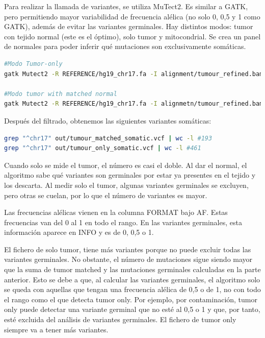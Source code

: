 Para realizar la llamada de variantes, se utiliza MuTect2. Es similar a GATK, pero permitiendo mayor variabilidad de frecuencia alélica (no solo 0, 0,5 y 1 como GATK), además de evitar las variantes germinales. Hay distintos modos: tumor con tejido normal (este es el óptimo), solo tumor y mitocondrial. Se crea un panel de normales para poder inferir qué mutaciones son exclusivamente somáticas. 
\begin{lstlisting}[language=bash]
#Modo Tumor-only 
gatk Mutect2 -R REFERENCE/hg19_chr17.fa -I alignment/tumour_refined.bam -O tumour_only_somatic.vcf

#Modo tumor with matched normal
gatk Mutect2 -R REFERENCE/hg19_chr17.fa -I alignmetn/tumour_refined.bam -I alignment/normal_refined.bam -normal Normal -O out/tumour_matched_somatic.vcf
\end{lstlisting}
 
Después del filtrado, obtenemos las siguientes variantes somáticas:
\begin{lstlisting}[language=bash]
grep "^chr17" out/tumour_matched_somatic.vcf | wc -l #193
grep "^chr17" out/tumour_only_somatic.vcf | wc -l #461
\end{lstlisting}
Cuando solo se mide el tumor, el número es casi el doble. Al dar el normal, el algoritmo sabe qué variantes son germinales por estar ya presentes en el tejido y los descarta. Al medir solo el tumor, algunas variantes germinales se excluyen, pero otras se cuelan, por lo que el número de variantes es mayor. 

Las frecuencias alélicas vienen en la columna FORMAT bajo AF. Estas frecuencias van del 0 al 1 en todo el rango. En las variantes germinales, esta información aparece en INFO y es de 0, 0,5 o 1. 

El fichero de solo tumor, tiene más variantes porque no puede excluir todas las variantes germinales. No obstante, el número de mutaciones sigue siendo mayor que la suma de tumor matched y las mutaciones germinales calculadas en la parte anterior. Esto se debe a que, al calcular las variantes germinales, el algoritmo solo se queda con aquellas que tengan una frecuencia alélica de 0,5 o de 1, no con todo el rango como el que detecta tumor only. Por ejemplo, por contaminación, tumor only puede detectar una variante germinal que no esté al 0,5 o 1 y que, por tanto, esté excluida del análisis de variantes germinales. El fichero de tumor only siempre va a  tener más variantes.
